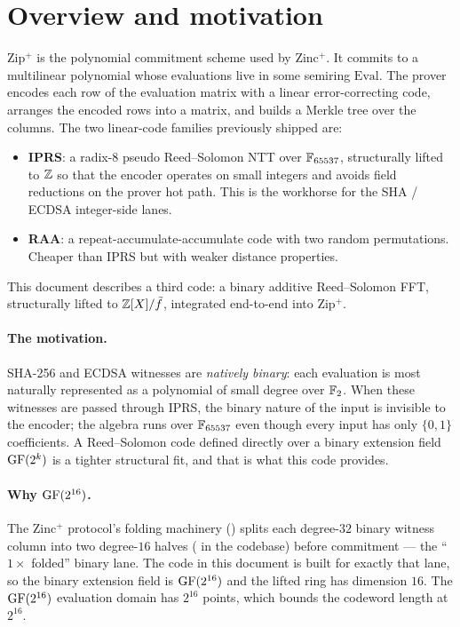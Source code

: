 \section{Overview and motivation}
\label{sec:overview}

Zip$^+$ is the polynomial commitment scheme used by Zinc$^+$. It commits
to a multilinear polynomial whose evaluations live in some semiring
$\mathrm{Eval}$. The prover encodes each row of the evaluation matrix
with a linear error-correcting code, arranges the encoded rows into
a matrix, and builds a Merkle tree over the columns. The two
linear-code families previously shipped are:

\begin{itemize}
  \item \textbf{IPRS}: a radix-8 pseudo Reed--Solomon NTT over
    $\mathbb{F}_{65537}$, structurally lifted to $\mathbb{Z}$ so that the encoder
    operates on small integers and avoids field reductions on the
    prover hot path. This is the workhorse for the SHA / ECDSA
    integer-side lanes.
  \item \textbf{RAA}: a repeat-accumulate-accumulate code with two
    random permutations. Cheaper than IPRS but with weaker distance
    properties.
\end{itemize}

This document describes a third code: a binary additive
Reed--Solomon FFT, structurally lifted to $\mathbb{Z}[X]/\tilde f$, integrated
end-to-end into Zip$^+$.

\paragraph{The motivation.}
SHA-256 and ECDSA witnesses are \emph{natively binary}: each evaluation
is most naturally represented as a polynomial of small degree over
$\mathbb{F}_2$. When these witnesses are passed through IPRS, the binary nature
of the input is invisible to the encoder; the algebra runs over
$\mathbb{F}_{65537}$ even though every input has only $\{0,1\}$ coefficients. A
Reed--Solomon code defined directly over a binary extension field
$\operatorname{GF}(2^k)$ is a tighter structural fit, and that is what this code
provides.

\paragraph{Why $\operatorname{GF}(2^{16})$.}
The Zinc$^+$ protocol's folding machinery ()
splits each degree-$32$ binary witness column into two
degree-$16$ halves ( in the codebase) before
commitment --- the ``$1\times$ folded'' binary lane. The code in this
document is built for exactly that lane, so the binary extension
field is $\operatorname{GF}(2^{16})$ and the lifted ring has dimension $16$. The
$\operatorname{GF}(2^{16})$ evaluation domain has $2^{16}$ points, which bounds
the codeword length at $2^{16}$.

